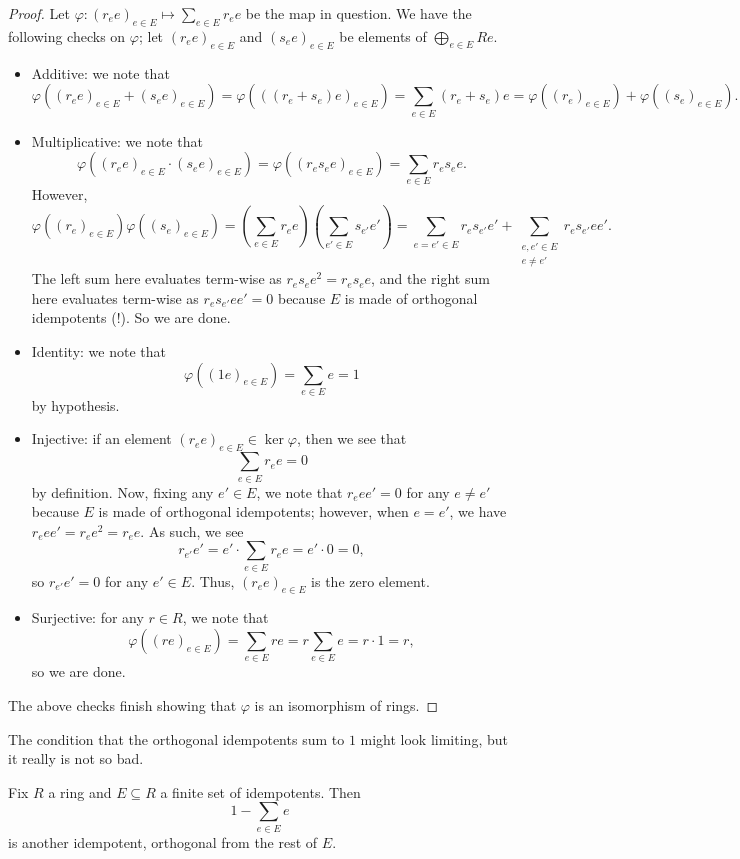 \begin{proof}
	Let $\varphi:(r_ee)_{e\in E}\mapsto\sum_{e\in E}r_ee$ be the map in question. We have the following checks on $\varphi$; let $(r_ee)_{e\in E}$ and $(s_ee)_{e\in E}$ be elements of $\bigoplus_{e\in E}Re$.
	\begin{itemize}
		\item Additive: we note that
		\[\varphi\left((r_ee)_{e\in E}+(s_ee)_{e\in E}\right)=\varphi\left(((r_e+s_e)e)_{e\in E}\right)=\sum_{e\in E}(r_e+s_e)e=\varphi\left((r_e)_{e\in E}\right)+\varphi\left((s_e)_{e\in E}\right).\]
		\item Multiplicative: we note that
		\[\varphi\left((r_ee)_{e\in E}\cdot(s_ee)_{e\in E}\right)=\varphi\left((r_es_ee)_{e\in E}\right)=\sum_{e\in E}r_es_ee.\]
		However,
		\[\varphi\left((r_e)_{e\in E}\right)\varphi\left((s_e)_{e\in E}\right)=\left(\sum_{e\in E}r_ee\right)\left(\sum_{e'\in E}s_{e'}e'\right)=\sum_{e=e'\in E}r_es_{e'}e'+\sum_{\substack{e,e'\in E\\e\ne e'}}r_es_{e'}ee'.\]
		The left sum here evaluates term-wise as $r_es_ee^2=r_es_ee$, and the right sum here evaluates term-wise as $r_es_{e'}ee'=0$ because $E$ is made of orthogonal idempotents (!). So we are done.
		\item Identity: we note that
		\[\varphi\left((1e)_{e\in E}\right)=\sum_{e\in E}e=1\]
		by hypothesis.
		\item Injective: if an element $(r_ee)_{e\in E}\in\ker\varphi$, then we see that
		\[\sum_{e\in E}r_ee=0\]
		by definition. Now, fixing any $e'\in E$, we note that $r_eee'=0$ for any $e\ne e'$ because $E$ is made of orthogonal idempotents; however, when $e=e'$, we have $r_eee'=r_ee^2=r_ee$. As such, we see
		\[r_{e'}e'=e'\cdot\sum_{e\in E}r_ee=e'\cdot0=0,\]
		so $r_{e'}e'=0$ for any $e'\in E$. Thus, $(r_ee)_{e\in E}$ is the zero element.
		\item Surjective: for any $r\in R$, we note that
		\[\varphi\left((re)_{e\in E}\right)=\sum_{e\in E}re=r\sum_{e\in E}e=r\cdot1=r,\]
		so we are done.
	\end{itemize}
	The above checks finish showing that $\varphi$ is an isomorphism of rings.
\end{proof}
The condition that the orthogonal idempotents sum to $1$ might look limiting, but it really is not so bad.
\begin{lemma}
	Fix $R$ a ring and $E\subseteq R$ a finite set of idempotents. Then
	\[1-\sum_{e\in E}e\]
	is another idempotent, orthogonal from the rest of $E$.
\end{lemma}
